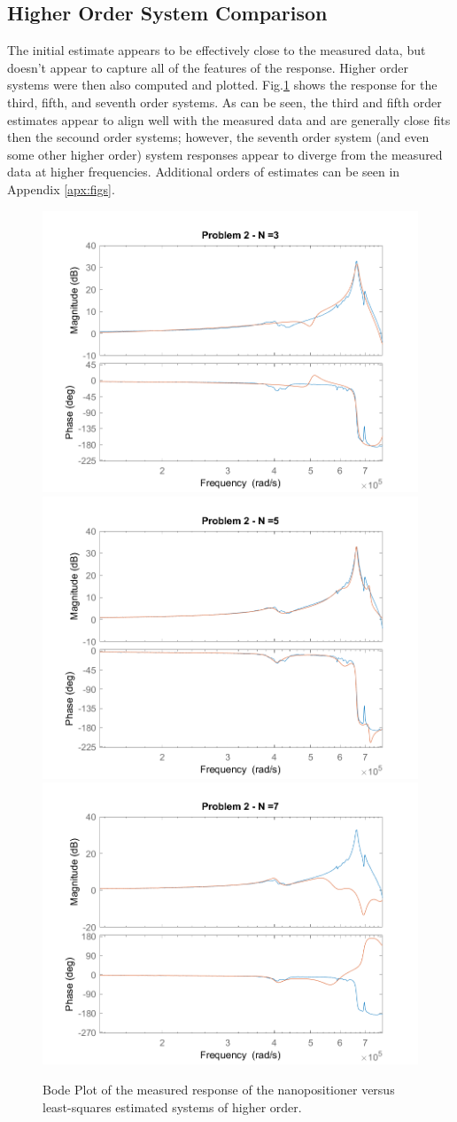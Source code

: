 \documentclass[]{article}
\renewcommand{\figurename}{Fig.}
\begin{document}
	\subsection{Higher Order System Comparison}
		The initial estimate appears to be effectively close to the measured data, but doesn't appear to capture all of the features of the response. Higher order systems were then also computed and plotted. \figurename \ref{fig:pblm2_n=357} shows the response for the third, fifth, and seventh order systems. As can be seen, the third and fifth order estimates appear to align well with the measured data and are generally close fits then the secound order systems; however, the seventh order system (and even some other higher order) system responses appear to diverge from the measured data at higher frequencies. Additional orders of estimates can be seen in Appendix \ref{apx:figs}.
		
		\begin{figure}
			\centering
			\includegraphics[width=0.6\linewidth]{fig/MECH6325_CA1_pblm2_n=3}
			\includegraphics[width=0.6\linewidth]{fig/MECH6325_CA1_pblm2_n=5}
			\includegraphics[width=0.6\linewidth]{fig/MECH6325_CA1_pblm2_n=7}
			\caption{Bode Plot of the measured response of the nanopositioner versus least-squares estimated systems of higher order.}
			\label{fig:pblm2_n=357}
		\end{figure}
\end{document}
